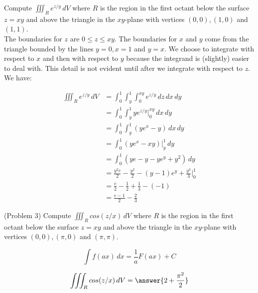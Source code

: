 \documentclass[handout]{ximera}
\begin{document}
\begin{example}[Example 3]
Compute $\iiint_R  e^{z/y} \, dV$ where $R$ is the region in the first octant below the 
surface $z = xy$ and above the triangle in the $xy$-plane with vertices $(0,0), (1,0)$ and $(1,1)$.\\


The boundaries for $z$ are $0 \leq z \leq xy$. The boundaries for $x$ and $y$ come from the triangle bounded by the lines
$y = 0, x = 1$ and $y = x$.  We choose to integrate with respect to $x$ and then with respect to $y$ because the
integrand is (slightly) easier to deal with.  This detail is not evident until after we integrate with respect to $z$.
We have:

\begin{align*}
\iiint_R e^{z/y} \, dV & = \int_0^1 \int_y^1 \int_0^{xy} e^{z/y} \, dz \, dx \, dy\\
                 & = \int_0^1 \int_y^1 ye^{z/y}\bigg|_{0}^{xy} \,dx \, dy\\
                 & = \int_0^1 \int_y^1 \left(ye^x - y\right) \,dx \, dy\\
                 &= \int_0^1 \left(ye^x - xy\right) \bigg|_y^1 \, dy\\
                 &= \int_0^1 \left(ye - y - ye^y + y^2\right) \, dy\\
                 &= \frac{y^2 e}{2} - \frac{y^2}{2} - (y-1)e^y + \frac{y^3}{3} \bigg|_0^1\\
                 &= \frac{e}{2} - \frac12 + \frac13 - (-1)\\
                 &= \frac{e-1}{2} - \frac23
\end{align*} 

\end{example}

\begin{problem}(Problem 3)
Compute $\iiint_R  cos(z/x) \, dV$ where $R$ is the region in the first octant below the 
surface $z = xy$ and above the triangle in the $xy$-plane with vertices $(0,0), (\pi, 0)$ and $(\pi, \pi)$.\\
\begin{hint}
\[
\int f(ax) \, dx = \frac{1}{a} F(ax) + C
\]
\end{hint}
\[
\iiint_R  cos(z/x) \, dV = \answer{2 +\frac{\pi^2}{2}}
\]

\end{problem}
\end{document}

